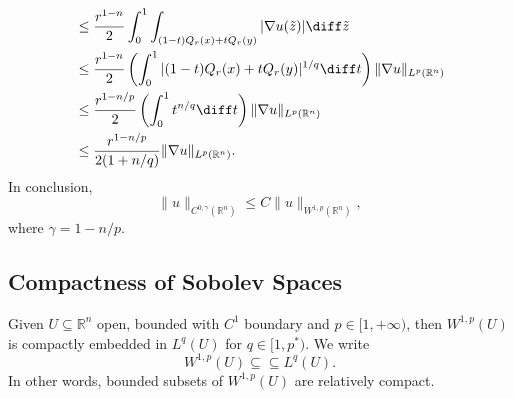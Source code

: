 \documentclass[12pt]{article}
\begin{document}
\begin{proofbox}
\begin{align*}
		    &\leq \frac{r^{1-n}}{2} \int_0^1 \int_{(1 - t)Q_r(x)+ tQ_r(y)} |\nabla u(\tilde z)| \diff \tilde z \\
		    &\leq \frac{r^{1-n}}{2} \left( \int_0^1 |(1 - t) Q_r(x) + t Q_r(y)|^{1/q} \diff t \right) \|\nabla u\|_{L^{p}(\mathbb{R}^n)} \\
		    &\leq \frac{r^{1 - n/p}}{2} \left( \int_0^1 t^{n/q} \diff t \right) \|\nabla u\|_{L^p(\mathbb{R}^n)} \\
		    &\leq \frac{r^{1-n/p}}{2(1 + n/q)} \|\nabla u\|_{L^p(\mathbb{R}^n)}.
	\end{align*}
	In conclusion,
	\[
	\|u\|_{C^{0, \gamma}(\mathbb{R}^n)} \leq C \|u\|_{W^{1,p}(\mathbb{R}^n)},
	\]
	where $\gamma = 1 - n/p$.
\end{proofbox}

\subsection{Compactness of Sobolev Spaces}%
\label{sub:cpt_sob}

\begin{theorem}
	Given $U \subseteq \mathbb{R}^n$ open, bounded with $C^1$ boundary and $p \in [1, +\infty)$, then $W^{1, p}(U)$ is compactly embedded in $L^q(U)$ for $q \in [1, p^{\ast})$. We write
	\[
	W^{1,p}(U) \subseteq \subseteq L^q(U).
	\]
	In other words, bounded subsets of $W^{1,p}(U)$ are relatively compact.
\end{theorem}
\end{document}
